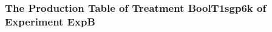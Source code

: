  \begin{frame}
 \fontsize{8pt}{9pt}\selectfont
 \frametitle{ The Production Table of Treatment BoolT1sgp6k of Experiment ExpB }

 \label{ExpBGrammarTable009.tex}  
 \end{frame}

